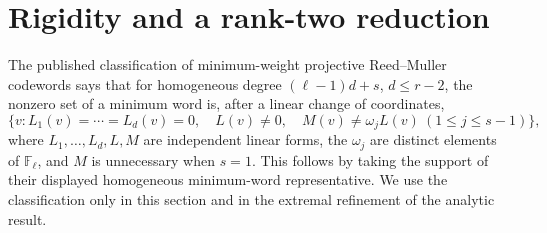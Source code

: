 \documentclass[11pt]{article}
\theoremstyle{remark}\newtheorem{remark}[theorem]{Remark}
\newcommand{\F}{\mathbb F}
\begin{document}
\section{Rigidity and a rank-two reduction}
The published classification of minimum-weight projective Reed--Muller codewords \cite[Theorem 4.3]{GL} says that for homogeneous degree $(\ell-1)d+s$, $d\le r-2$, the nonzero set of a minimum word is, after a linear change of coordinates,
\begin{equation}\label{eq:geometry}
 \{v:L_1(v)=\cdots=L_d(v)=0,\quad L(v)\ne0,\quad
 M(v)\ne\omega_j L(v)\ (1\le j\le s-1)\},
\end{equation}
where $L_1,\ldots,L_d,L,M$ are independent linear forms, the $\omega_j$ are distinct elements of $\F_\ell$, and $M$ is unnecessary when $s=1$. This follows by taking the support of their displayed homogeneous minimum-word representative. We use the classification only in this section and in the extremal refinement of the analytic result.
\end{document}
